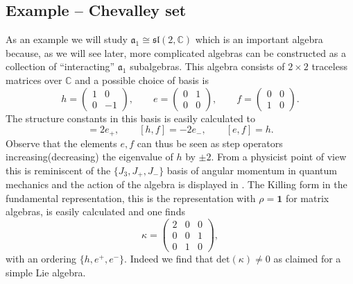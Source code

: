 \subsection{Example -- Chevalley set}
As an example we will study $\mathfrak{a}_1\cong\mathfrak{sl}(2,\mathbb{C})$ which is an important algebra because, as we will see later, more complicated algebras can be constructed as a collection of ``interacting'' $\mathfrak{a}_1$ subalgebras. This algebra consists of $2\times 2$ traceless matrices over $\mathbb{C}$ and a possible choice of basis is
\begin{equation}
    h=\begin{pmatrix}1&0\\0 &-1\end{pmatrix},\qquad e=\begin{pmatrix}0&1\\0 &0\end{pmatrix},\qquad f=\begin{pmatrix}0&0\\1 &0\end{pmatrix}.
\end{equation}
The structure constants in this basis is easily calculated to
\begin{equation}
    [h,e] = 2e_+,\qquad [h,f]=-2e_-, \qquad [e,f]=h.
\end{equation}
Observe that the elements $e,f$ can thus be seen as step operators increasing(decreasing) the eigenvalue of $h$ by $\pm 2$. From a physicist point of view this is reminiscent of the $\{J_3,J_+,J_-\}$ basis of angular momentum in quantum mechanics and the action of the algebra is displayed in . The Killing form in the fundamental representation, this is the representation with $\rho =\mathbf{1}$ for matrix algebras, is easily calculated and one finds 
\begin{equation}
    \kappa = \begin{pmatrix}2&0&0\\0&0&1\\0&1&0\end{pmatrix},
\end{equation}
with an ordering $\{h,e^+,e^-\}$. Indeed we find that $\text{det}(\kappa)\neq 0$ as claimed for a simple Lie algebra.

